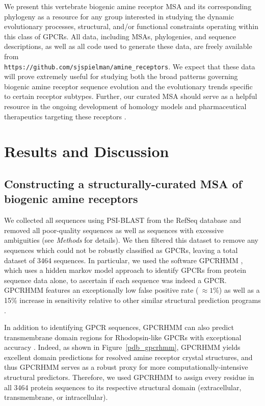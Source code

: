 \documentclass[fleqn,10pt]{wlpeerj}
\begin{document}
We present this vertebrate biogenic amine receptor MSA and its corresponding phylogeny as a resource for any group interested in studying the dynamic evolutionary processes, structural, and/or functional constraints operating within this class of GPCRs. All data, including MSAs, phylogenies, and sequence descriptions, as well as all code used to generate these data, are freely available from \\\texttt{https://github.com/sjspielman/amine\_receptors}. We expect that these data will prove extremely useful for studying both the broad patterns governing biogenic amine receptor sequence evolution and the evolutionary trends specific to certain receptor subtypes. Further, our curated MSA should serve as a helpful resource in the ongoing development of homology models and pharmaceutical therapeutics targeting these receptors \citep{Kristiansen2004,Ishiguro2004,Eversetal2005,Masonetal2012}.




\section*{Results and Discussion}

\subsection*{Constructing a structurally-curated MSA of biogenic amine receptors}

We collected all sequences using PSI-BLAST from the RefSeq database \citep{refseq} and removed all poor-quality sequences as well as  sequences with excessive ambiguities (see \emph{Methods} for details). We then filtered this dataset to remove any sequences which could not be robustly classified as GPCRs, leaving a total dataset of 3464 sequences. In particular, we used the software GPCRHMM \citep{Wistrand2006}, which uses a hidden markov model approach to identify GPCRs from protein sequence data alone, to ascertain if each sequence was indeed a GPCR. GPCRHMM features an exceptionally low false positive rate ($~\approx 1\%$) as well as a 15\% increase in sensitivity relative to other similar structural prediction programs \citep{Wistrand2006}. 

In addition to identifying GPCR sequences, GPCRHMM can also predict transmembrane domain regions for Rhodopsin-like GPCRs with exceptional accuracy \citep{SpielmanWilke2013}. Indeed, as shown in Figure~\ref{pdb_gpcrhmm}, GPCRHMM yields excellent domain predictions for resolved amine receptor crystal structures, and thus GPCRHMM serves as a robust proxy for more computationally-intensive structural predictors. Therefore, we used GPCRHMM to assign every residue in all 3464 protein sequences to its respective structural domain (extracellular, transmembrane, or intracellular). 
\end{document}
